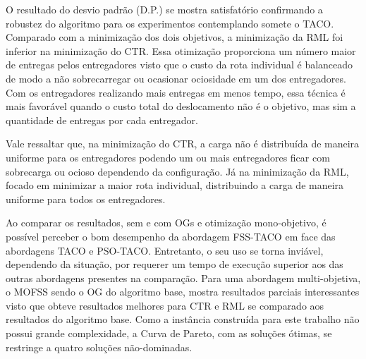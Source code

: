 O resultado do desvio padrão (D.P.) se mostra satisfatório confirmando a robustez do algoritmo para os experimentos contemplando somete o TACO. Comparado com a minimização dos dois objetivos, a minimização da RML foi inferior na minimização do CTR. Essa otimização proporciona um número maior de entregas pelos entregadores visto que o custo da rota individual é balanceado de modo a não sobrecarregar ou ocasionar ociosidade em um dos entregadores. Com os entregadores realizando mais entregas em menos tempo, essa técnica é mais favorável quando o custo total do deslocamento não é o objetivo, mas sim a quantidade de entregas por cada entregador.

Vale ressaltar que, na minimização do CTR, a carga não é distribuída de maneira uniforme para os entregadores podendo um ou mais entregadores ficar com sobrecarga ou ocioso dependendo da configuração. Já na minimização da RML, focado em minimizar a maior rota individual, distribuindo a carga de maneira uniforme para todos os entregadores.

Ao comparar os resultados, sem e com OGs e otimização mono-objetivo, é possível perceber o bom desempenho da abordagem FSS-TACO em face das abordagens TACO e PSO-TACO. Entretanto, o seu uso se torna inviável, dependendo da situação, por requerer um tempo de execução superior aos das outras abordagens presentes na comparação. Para uma abordagem multi-objetiva, o MOFSS sendo o OG do algoritmo base, mostra resultados parciais interessantes visto que obteve resultados melhores para CTR e RML se comparado aos resultados do algoritmo base. Como a instância construída para este trabalho não possui grande complexidade, a Curva de Pareto, com as soluções ótimas, se restringe a quatro soluções não-dominadas.